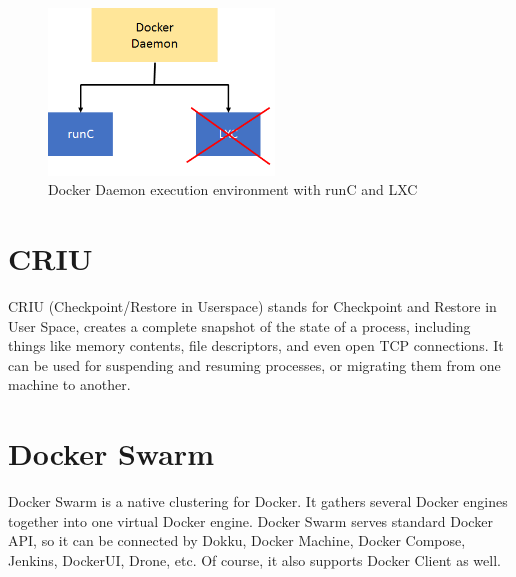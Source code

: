 \begin{figure}[h]
\begin{center}
\includegraphics[width=6cm]{figure/docker_LXC.png}
\end{center}
\caption{Docker Daemon execution environment with runC and LXC}
\label{fig:docker_LXC}
\end{figure}

\section{CRIU}
CRIU \cite{CRIU} (Checkpoint/Restore in Userspace) stands for Checkpoint and Restore in User Space, creates a complete snapshot of the state of a process, including things like memory contents, file descriptors, and even open TCP connections. It can be used for suspending and resuming processes, or migrating them from one machine to another.

\section{Docker Swarm}
Docker Swarm \cite{DockerSwarm} is a native clustering for Docker. It gathers several Docker engines together into one virtual Docker engine. Docker Swarm serves standard Docker API, so it can be connected by Dokku, Docker Machine, Docker Compose, Jenkins, DockerUI, Drone, etc. Of course, it also supports Docker Client as well.

